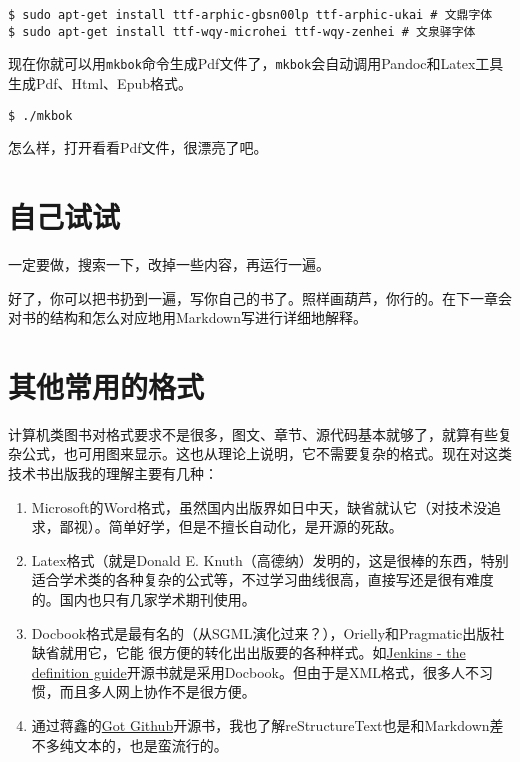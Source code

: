 \documentclass[a4paper]{book}
\begin{document}
{\footnotesize\begin{shaded}\begin{verbatim}
$ sudo apt-get install ttf-arphic-gbsn00lp ttf-arphic-ukai # 文鼎字体
$ sudo apt-get install ttf-wqy-microhei ttf-wqy-zenhei # 文泉驿字体
\end{verbatim}\end{shaded}}
现在你就可以用{\texttt{mkbok}}命令生成Pdf文件了，{\texttt{mkbok}}会自动调用Pandoc和Latex工具生成Pdf、Html、Epub格式。

{\footnotesize\begin{shaded}\begin{verbatim}
$ ./mkbok	
\end{verbatim}\end{shaded}}
怎么样，打开看看Pdf文件，很漂亮了吧。

\section{自己试试}

一定要做，搜索一下，改掉一些内容，再运行一遍。

好了，你可以把书扔到一遍，写你自己的书了。照样画葫芦，你行的。在下一章会对书的结构和怎么对应地用Markdown写进行详细地解释。

\section{其他常用的格式}

计算机类图书对格式要求不是很多，图文、章节、源代码基本就够了，就算有些复杂公式，也可用图来显示。这也从理论上说明，它不需要复杂的格式。现在对这类技术书出版我的理解主要有几种：

\begin{enumerate}\setlength{\itemsep}{1pt}\setlength{\parskip}{0pt}\setlength{\parsep}{0pt}
\item
  Microsoft的Word格式，虽然国内出版界如日中天，缺省就认它（对技术没追求，鄙视）。简单好学，但是不擅长自动化，是开源的死敌。
\item
  Latex格式（就是Donald E. Knuth（高德纳）发明的，这是很棒的东西，特别适合学术类的各种复杂的公式等，不过学习曲线很高，直接写还是很有难度的。国内也只有几家学术期刊使用。
\item
  Docbook格式是最有名的（从SGML演化过来？），Orielly和Pragmatic出版社缺省就用它，它能 很方便的转化出出版要的各种样式。如\href{http://www.wakaleo.com/books/jenkins-the-definitive-guide}{Jenkins - the definition guide}开源书就是采用Docbook。但由于是XML格式，很多人不习惯，而且多人网上协作不是很方便。
\item
  通过蒋鑫的\href{http://www.worldhello.net/gotgithub/}{Got Github}开源书，我也了解reStructureText也是和Markdown差不多纯文本的，也是蛮流行的。
\end{enumerate}
\end{document}
